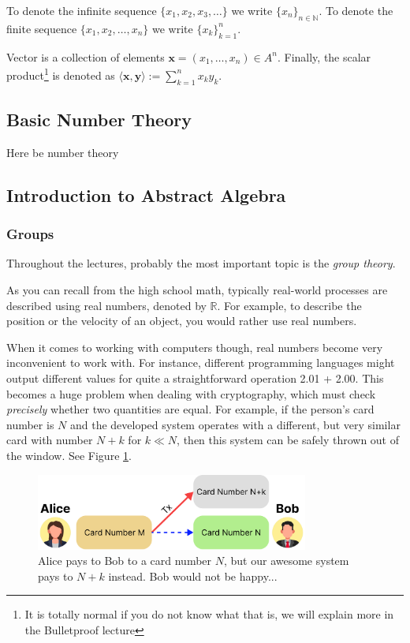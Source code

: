 \documentclass[../lecture-notes.tex]{subfiles}
\begin{document}
To denote the infinite sequence $\{x_1,x_2,x_3,\dots\}$ we write $\{x_n\}_{n \in \mathbb{N}}$. To denote the finite sequence $\{x_1,x_2,\dots,x_n\}$ we write $\{x_k\}_{k=1}^n$. 

Vector is a collection of elements $\mathbf{x} = (x_1,\dots,x_n) \in A^n$. Finally, the scalar product\footnote{It is totally normal if you do not know what that is, we will explain more in the Bulletproof lecture} is denoted as $\langle \mathbf{x}, \mathbf{y} \rangle := \sum_{k=1}^n x_ky_k$.

\subsection{Basic Number Theory}

Here be number theory

\subsection{Introduction to Abstract Algebra}


\subsubsection{Groups}

Throughout the lectures, probably the most important topic is the \textit{group theory}. 

As you can recall from the high school math, typically real-world processes are described using real numbers, denoted by $\mathbb{R}$. For example, to describe the position or the velocity of an object, you would rather use real numbers. 

When it comes to working with computers though, real numbers become very inconvenient to work with. For instance, different programming languages might output different values for quite a straightforward operation \textsf{2.01 + 2.00}. This becomes a huge problem when dealing with cryptography, which must check \textit{precisely} whether two quantities are equal. 
For example, if the person's card number is $N$ and the developed system operates with a different, but very similar card with number $N + k$ for $k \ll N$, then this system can be safely thrown out of the window. See Figure \ref{fig:why_integers}.

\begin{figure}
    \centering
    \includegraphics[width=0.8\textwidth]{images/lecture_1/why_integers.pdf}
    \caption{Alice pays to Bob to a card number $N$, but our awesome system pays to $N+k$ instead. Bob would not be happy...}
    \label{fig:why_integers}
\end{figure}
\end{document}
